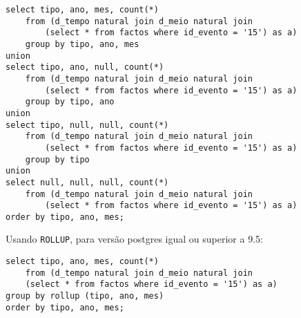 \documentclass[10pt,a4paper]{article}
\begin{document}
\begin{verbatim}
select tipo, ano, mes, count(*)
    from (d_tempo natural join d_meio natural join
        (select * from factos where id_evento = '15') as a) 
    group by tipo, ano, mes
union
select tipo, ano, null, count(*) 
    from (d_tempo natural join d_meio natural join
        (select * from factos where id_evento = '15') as a) 
    group by tipo, ano
union
select tipo, null, null, count(*) 
    from (d_tempo natural join d_meio natural join
        (select * from factos where id_evento = '15') as a) 
    group by tipo
union
select null, null, null, count(*) 
    from (d_tempo natural join d_meio natural join
        (select * from factos where id_evento = '15') as a)
order by tipo, ano, mes;
\end{verbatim}

Usando \texttt{ROLLUP}, para versão postgres igual ou superior a 9.5:

\begin{verbatim}
select tipo, ano, mes, count(*)
    from (d_tempo natural join d_meio natural join
    (select * from factos where id_evento = '15') as a)
group by rollup (tipo, ano, mes)
order by tipo, ano, mes;
\end{verbatim}
\end{document}
